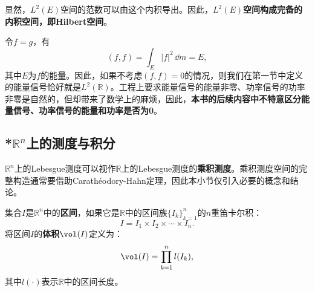 
显然，$L^2(E)$空间的范数可以由这个内积导出。因此，\textbf{$L^2(E)$空间构成完备的内积空间，即Hilbert空间}。

令$f=g$，有
\begin{equation}
    (f,f)=\int_{E}|f|^2\,\dd m=E,
\end{equation}
其中$E$为$f$的能量。因此，如果不考虑$(f,f)=0$的情况，则我们在第一节中定义的能量信号恰好就是$L^2(\mathbb{R})$。工程上要求能量信号的能量非零、功率信号的功率非零是自然的，但却带来了数学上的麻烦，因此，\textbf{本书的后续内容中不特意区分能量信号、功率信号的能量和功率是否为0}。






\subsection{\texorpdfstring{*$\mathbb{R}^n$上的测度与积分}{*Rn上的测度与积分}}

$\mathbb{R}^n$上的Lebesgue测度可以视作$\mathbb{R}$上的Lebesgue测度的\textbf{乘积测度}。乘积测度空间的完整构造通常要借助Carathéodory-Hahn定理，因此本小节仅引入必要的概念和结论。

\begin{definition}[区间]
    集合$I$是$\mathbb{R}^n$中的\textbf{区间}，如果它是$\mathbb{R}$中的区间族$\{I_k\}_{k=1}^n$的$n$重笛卡尔积：
    \begin{equation}
        I=I_1\times I_2\times\cdots\times I_n.
    \end{equation}
    将区间$I$的\textbf{体积}$\vol(I)$定义为：
    \begin{equation}
        \vol(I)=\prod_{k=1}^n l(I_k),
    \end{equation}
    其中$l(\cdot)$表示$\mathbb{R}$中的区间长度。
\end{definition}

